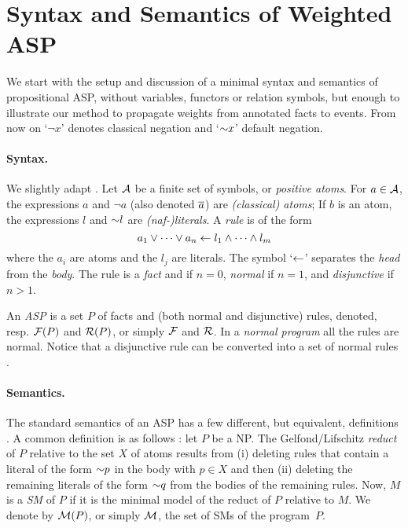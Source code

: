 \documentclass[x11names]{tlp}
\renewcommand{\cite}{\citep}
\begin{document}
\section{Syntax and Semantics of Weighted ASP}
\label{sec:syntax.and.semantics}

We start with the setup and discussion of a minimal syntax and semantics of propositional \ac{ASP}, without variables, functors or relation symbols, but enough to illustrate our method to propagate weights from annotated facts to events. From now on `$\neg x$' denotes classical negation and `$\operatorname{\sim\!} x$' default negation.

\paragraph{Syntax.}
\label{par:syntax}

We slightly adapt \cite{calimeri2020aspcore}. Let $\ATOMSset$ be a finite set of symbols, or \emph{positive atoms}. 
For $a \in \ATOMSset$, the expressions $a$ and $\neg a$ (also denoted $\overline{a}$) are \emph{(classical) atoms}; If $b$ is an atom, the expressions $l$ and $\operatorname{\sim\!} l$ are \emph{(naf-)literals}.
%
A \textit{rule} is of the form 
$$
a_1 \vee \cdots \vee a_n \leftarrow 
	l_1 \wedge \cdots \wedge l_m
$$
where the $a_i$ are atoms and the $l_j$ are literals. The symbol `$\leftarrow$' separates the \textit{head} from the \textit{body}. The rule is a \emph{fact} and if $n = 0$, \emph{normal} if $n = 1$, and \emph{disjunctive} if $n > 1$.

An \textit{\acf{ASP}} is a set $P$ of facts and (both normal and disjunctive) rules, denoted, resp. $\FACTSset\at{P}$ and $\RULESset\at{P}$, or simply $\FACTSset$ and $\RULESset$.
In a \textit{normal program} all the rules are normal.
Notice that a disjunctive rule can be converted into a set of normal rules \cite{gebser2022answer}.

\paragraph{Semantics.}

The standard semantics of an \ac{ASP} has a few different, but equivalent, definitions \cite{lifschitz2008twelve}.
A common definition is as follows \cite{gelfond1988stable}: let $P$ be a \acl{NP}.
The Gelfond/Lifschitz \emph{reduct} of $P$ relative to the set $X$ of atoms results from (i) deleting rules that contain a literal of the form $\operatorname{\sim\!} p$ in the body with $p \in X$ and then (ii) deleting the remaining literals of the form $\operatorname{\sim\!} q$ from the bodies of the remaining rules.
Now, $M$ is a \textit{\acf{SM}} of $P$ if it is the minimal model of the reduct of $P$ relative to $M$.
We denote by $\MODELset\at{P}$, or simply $\MODELset$, the set of \aclp{SM} of the program~$P$.
\end{document}
